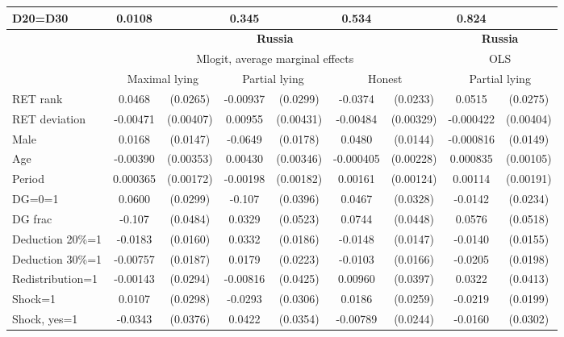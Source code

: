 \begin{tabular}{l|cccccc|cc}
D20=D30         &   0.0108         &         &    0.345         &         &    0.534         &         &    0.824         &         \\
\hline\hline
&\multicolumn{6}{c|}{\bf Russia}&\multicolumn{2}{c}{\bf Russia}\\ &\multicolumn{6}{c|}{Mlogit, average marginal effects }&\multicolumn{2}{c}{OLS}\\
                &\multicolumn{2}{c}{Maximal lying}&\multicolumn{2}{c}{Partial lying}&\multicolumn{2}{c}{Honest}  &\multicolumn{2}{c}{Partial lying}\\
\hline
RET rank        &   0.0468\sym{*}  & (0.0265)& -0.00937         & (0.0299)&  -0.0374         & (0.0233)&   0.0515\sym{*}  & (0.0275)\\
RET deviation   & -0.00471         &(0.00407)&  0.00955\sym{**} &(0.00431)& -0.00484         &(0.00329)&-0.000422         &(0.00404)\\
Male            &   0.0168         & (0.0147)&  -0.0649\sym{***}& (0.0178)&   0.0480\sym{***}& (0.0144)&-0.000816         & (0.0149)\\
Age             & -0.00390         &(0.00353)&  0.00430         &(0.00346)&-0.000405         &(0.00228)& 0.000835         &(0.00105)\\
Period          & 0.000365         &(0.00172)& -0.00198         &(0.00182)&  0.00161         &(0.00124)&  0.00114         &(0.00191)\\
DG=0=1          &   0.0600\sym{**} & (0.0299)&   -0.107\sym{***}& (0.0396)&   0.0467         & (0.0328)&  -0.0142         & (0.0234)\\
DG frac         &   -0.107\sym{**} & (0.0484)&   0.0329         & (0.0523)&   0.0744\sym{*}  & (0.0448)&   0.0576         & (0.0518)\\
Deduction 20\%=1&  -0.0183         & (0.0160)&   0.0332\sym{*}  & (0.0186)&  -0.0148         & (0.0147)&  -0.0140         & (0.0155)\\
Deduction 30\%=1& -0.00757         & (0.0187)&   0.0179         & (0.0223)&  -0.0103         & (0.0166)&  -0.0205         & (0.0198)\\
Redistribution=1& -0.00143         & (0.0294)& -0.00816         & (0.0425)&  0.00960         & (0.0397)&   0.0322         & (0.0413)\\
Shock=1         &   0.0107         & (0.0298)&  -0.0293         & (0.0306)&   0.0186         & (0.0259)&  -0.0219         & (0.0199)\\
Shock, yes=1    &  -0.0343         & (0.0376)&   0.0422         & (0.0354)& -0.00789         & (0.0244)&  -0.0160         & (0.0302)\\

\end{tabular}

